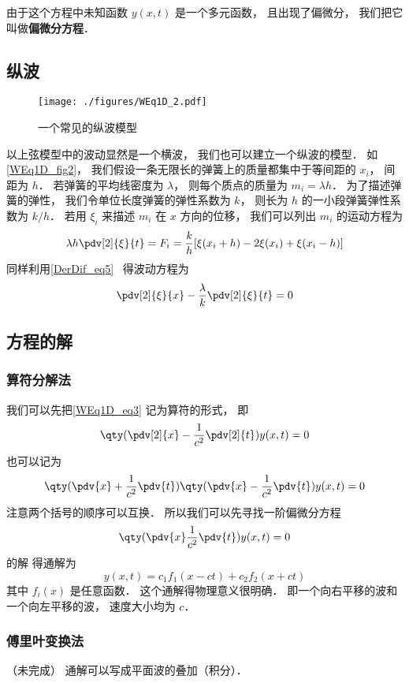 由于这个方程中未知函数 $y(x,t)$ 是一个多元函数， 且出现了偏微分， 我们把它叫做\textbf{偏微分方程}．

\subsection{纵波}

\begin{figure}[ht]
\centering
\texttt{[image: ./figures/WEq1D\_2.pdf]}
\caption{一个常见的纵波模型} \label{WEq1D_fig2}
\end{figure}

以上弦模型中的波动显然是一个横波， 我们也可以建立一个纵波的模型． 如\autoref{WEq1D_fig2}， 我们假设一条无限长的弹簧上的质量都集中于等间距的 $x_i$， 间距为 $h$． 若弹簧的平均线密度为 $\lambda$， 则每个质点的质量为 $m_i = \lambda h$． 为了描述弹簧的弹性， 我们令单位长度弹簧的弹性系数为 $k$， 则长为 $h$ 的一小段弹簧弹性系数为 $k/h$． 若用 $\xi_i$ 来描述 $m_i$ 在 $x$ 方向的位移， 我们可以列出 $m_i$ 的运动方程为
\begin{equation}
\lambda h \pdv[2]{\xi}{t} = F_i = \frac kh [\xi(x_i + h) - 2\xi(x_i) + \xi(x_i - h)]
\end{equation}
同样利用\autoref{DerDif_eq5}~ 得波动方程为
\begin{equation}
\pdv[2]{\xi}{x} - \frac{\lambda}{k}\pdv[2]{\xi}{t} = 0
\end{equation}

\subsection{方程的解}

\subsubsection{算符分解法}
我们可以先把\autoref{WEq1D_eq3} 记为算符的形式， 即
\begin{equation}
\qty(\pdv[2]{x} - \frac{1}{c^2}\pdv[2]{t}) y(x, t) = 0
\end{equation}
也可以记为
\begin{equation}
\qty(\pdv{x} + \frac{1}{c^2}\pdv{t})\qty(\pdv{x} - \frac{1}{c^2}\pdv{t}) y(x, t) = 0
\end{equation}
注意两个括号的顺序可以互换． 所以我们可以先寻找一阶偏微分方程
\begin{equation}
\qty(\pdv{x}  \frac{1}{c^2}\pdv{t})y(x, t)  = 0
\end{equation}
的解%
得通解为
\begin{equation}
y(x, t) = c_1 f_1(x - ct) + c_2 f_2(x + ct)
\end{equation}
其中 $f_i(x)$ 是任意函数． 这个通解得物理意义很明确． 即一个向右平移的波和一个向左平移的波， 速度大小均为 $c$．

\subsubsection{傅里叶变换法}
（未完成）
通解可以写成平面波的叠加（积分）．
